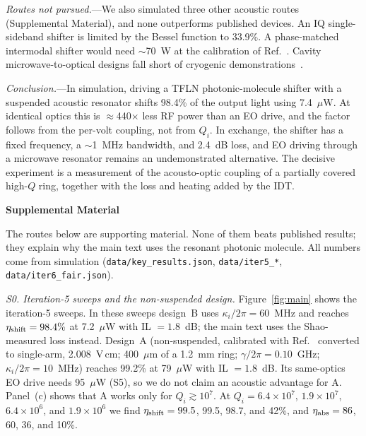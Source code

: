 \documentclass[aps,prl,reprint,superscriptaddress,amsmath,amssymb,floatfix]{revtex4-2}
\newcommand{\etash}{\eta_{\rm shift}}
\newcommand{\etaabs}{\eta_{\rm abs}}
\begin{document}
\emph{Routes not pursued.}---We also simulated three other acoustic routes (Supplemental Material), and none outperforms published devices. An IQ single-sideband shifter is limited by the Bessel function to 33.9\%. A phase-matched intermodal shifter would need $\sim$70~W at the calibration of Ref.~\cite{Shao2020}. Cavity microwave-to-optical designs fall short of cryogenic demonstrations~\cite{Weaver2024,Jiang2023,Warner2025,Mirhosseini2020}.

\emph{Conclusion.}---In simulation, driving a TFLN photonic-molecule shifter with a suspended acoustic resonator shifts 98.4\% of the output light using 7.4~$\mu$W. At identical optics this is $\approx$440$\times$ less RF power than an EO drive, and the factor follows from the per-volt coupling, not from $Q_i$. In exchange, the shifter has a fixed frequency, a $\sim$1~MHz bandwidth, and 2.4~dB loss, and EO driving through a microwave resonator remains an undemonstrated alternative. The decisive experiment is a measurement of the acousto-optic coupling of a partially covered high-$Q$ ring, together with the loss and heating added by the IDT.



\clearpage
\onecolumngrid
\begin{center}\textbf{\large Supplemental Material}\end{center}
\setcounter{figure}{0}
\setcounter{table}{0}
\setcounter{equation}{0}

The routes below are supporting material. None of them beats published results; they explain why the main text uses the resonant photonic molecule. All numbers come from simulation (\texttt{data/key\_results.json}, \texttt{data/iter5\_*}, \texttt{data/iter6\_fair.json}).

\emph{S0. Iteration-5 sweeps and the non-suspended design.} Figure~\ref{fig:main} shows the iteration-5 sweeps. In these sweeps design~B uses $\kappa_i/2\pi=60$~MHz and reaches $\etash=98.4\%$ at 7.2~$\mu$W with IL $=1.8$~dB; the main text uses the Shao-measured loss instead. Design~A (non-suspended, calibrated with Ref.~\cite{Ni2026} converted to single-arm, 2.008~V\,cm; 400~$\mu$m of a 1.2~mm ring; $\gamma/2\pi=0.10$~GHz; $\kappa_i/2\pi=10$~MHz) reaches 99.2\% at 79~$\mu$W with IL $=1.8$~dB. Its same-optics EO drive needs 95~$\mu$W (S5), so we do not claim an acoustic advantage for A. Panel~(c) shows that A works only for $Q_i\gtrsim10^7$. At $Q_i=6.4\times10^7$, $1.9\times10^7$, $6.4\times10^6$, and $1.9\times10^6$ we find $\etash=99.5$, 99.5, 98.7, and 42\%, and $\etaabs=86$, 60, 36, and 10\%.
\end{document}
